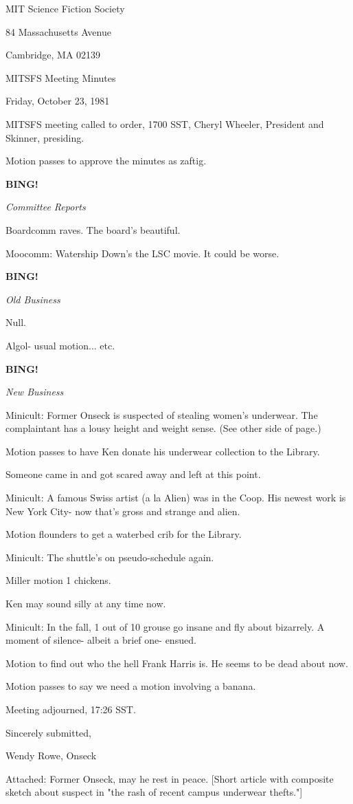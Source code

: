 \documentclass[12pt]{article}
\newcommand{\bing}{{\bf BING!} }
\newcommand{\goto}[1]{\bing \vskip 12pt \centerline{{\em{#1}}}}
\begin{document}
\begin{center}

MIT Science Fiction Society 

84 Massachusetts Avenue

Cambridge, MA 02139

\vspace{12pt}

MITSFS Meeting Minutes 

Friday, October 23, 1981

\end{center}
 
\vspace{18pt}

\setlength{\parskip}{6pt}

\noindent
MITSFS meeting called to order, 1700 SST,
Cheryl Wheeler, President and Skinner, presiding.

Motion passes to approve the minutes as zaftig.

\goto{Committee Reports}

Boardcomm raves. The board's beautiful.

Moocomm: Watership Down's the LSC movie. It could be worse.

\goto{Old Business}

Null.

Algol- usual motion... etc.

\goto{New Business}

Minicult: Former Onseck is suspected of stealing women's underwear. The complaintant has a lousy height and weight sense. (See other side of page.)

Motion passes to have Ken donate his underwear collection to the Library.

Someone came in and got scared away and left at this point.

Minicult: A famous Swiss artist (a la Alien) was in the Coop. His newest work is New York City- now that's gross and strange and alien.

Motion flounders to get a waterbed crib for the Library.

Minicult: The shuttle's on pseudo-schedule again.

Miller motion 1 chickens.

Ken may sound silly at any time now.

Minicult: In the fall, 1 out of 10 grouse go insane and fly about bizarrely. A moment of silence- albeit a brief one- ensued.

Motion to find out who the hell Frank Harris is. He seems to be dead about now.

Motion passes to say we need a motion involving a banana.

\vspace{12pt}

\noindent
Meeting adjourned, 17:26 SST.

\vspace{18pt}

\centerline{Sincerely submitted,}
\centerline{Wendy Rowe, Onseck}

Attached: Former Onseck, may he rest in peace. [Short article with composite sketch about suspect in "the rash of recent campus underwear thefts."]
\end{document}
